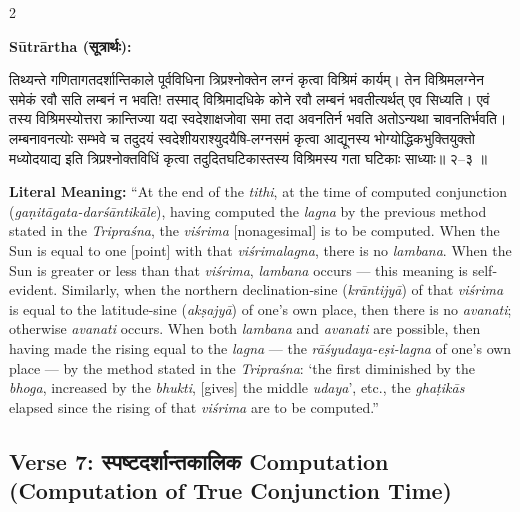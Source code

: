 \documentclass[11pt,a4paper]{article}
\newcommand{\dev}[1]{{\devanagarifont #1}}
\newenvironment{sanskritverse}{%
  \begin{center}\begin{minipage}{0.95\textwidth}
  \setlength{\leftskip}{1em}
  \setlength{\rightskip}{1em}
  \dev
}{\end{minipage}\end{center}}
\begin{document}
\begin{paracol}{2}

\noindent\textbf{Sūtrārtha (\dev{सूत्रार्थः}):}
\begin{sanskritverse}
तिथ्यन्ते गणितागतदर्शान्तिकाले पूर्वविधिना त्रिप्रश्नोक्तेन लग्नं कृत्वा विश्रिमं
कार्यम्। तेन विश्रिमलग्नेन समेकं रवौ सति लम्बनं न भवति! तस्माद् विश्रिमादधिके
कोने रवौ लम्बनं भवतीत्यर्थत् एव सिध्यति। एवं तस्य विश्रिमस्योत्तरा क्रान्तिज्या यदा
स्वदेशाक्षजोवा समा तदा अवनतिर्न भवति अतोऽन्यथा चावनतिर्भवति।
लम्बनावनत्योः सम्भवे च तदुदयं स्वदेशीयराश्युदयैषि-लग्नसमं कृत्वा
आद्यूनस्य भोग्योद्धिकभुक्तियुक्तो मध्योदयाद्य इति त्रिप्रश्नोक्तविधिं कृत्वा
तदुदितघटिकास्तस्य विश्रिमस्य गता घटिकाः साध्याः॥ २--३ ॥
\end{sanskritverse}

\switchcolumn

\textbf{Literal Meaning:} ``At the end of the \textit{tithi}, at the time of computed conjunction (\textit{gaṇitāgata-darśāntikāle}), having computed the \textit{lagna} by the previous method stated in the \textit{Tripraśna}, the \textit{viśrima} [nonagesimal] is to be computed. When the Sun is equal to one [point] with that \textit{viśrimalagna}, there is no \textit{lambana}. When the Sun is greater or less than that \textit{viśrima}, \textit{lambana} occurs --- this meaning is self-evident. Similarly, when the northern declination-sine (\textit{krāntijyā}) of that \textit{viśrima} is equal to the latitude-sine (\textit{akṣajyā}) of one's own place, then there is no \textit{avanati}; otherwise \textit{avanati} occurs. When both \textit{lambana} and \textit{avanati} are possible, then having made the rising equal to the \textit{lagna} --- the \textit{rāśyudaya-eṣi-lagna} of one's own place --- by the method stated in the \textit{Tripraśna}: `the first diminished by the \textit{bhoga}, increased by the \textit{bhukti}, [gives] the middle \textit{udaya}', etc., the \textit{ghaṭikās} elapsed since the rising of that \textit{viśrima} are to be computed.''

\end{paracol}

\subsection{Verse 7: {\devanagarifont स्पष्टदर्शान्तकालिक} Computation (Computation of True Conjunction Time)}
\end{document}
